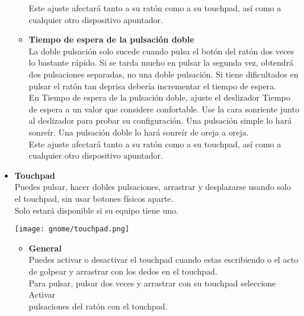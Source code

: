\begin{itemize}
\begin{itemize}
Este ajuste afectará tanto a su ratón como a su touchpad, así como a cualquier otro dispositivo apuntador.
\item{\bf Tiempo de espera de la pulsación doble}\\
La doble pulsación solo sucede cuando pulsa el botón del ratón dos veces lo bastante rápido. Si se tarda mucho en pulsar la segunda vez, obtendrá dos pulsaciones separadas, no una doble pulsación. Si tiene dificultados en pulsar el ratón tan deprisa debería incrementar el tiempo de espera.\\

En Tiempo de espera de la pulsación doble, ajuste el deslizador Tiempo de espera a un valor que considere confortable. Use la cara sonriente junto al deslizador para probar su configuración. Una pulsación simple lo hará sonreír. Una pulsación doble lo hará sonreír de oreja a oreja.\\

Este ajuste afectará tanto a su ratón como a su touchpad, así como a cualquier otro dispositivo apuntador.
\end{itemize}

\item{\large \bf Touchpad}\\
Puedes pulsar, hacer dobles pulsaciones, arrastrar y desplazarse usando solo el touchpad, sin usar botones físicos aparte.\\
Solo estará disponible si su equipo tiene uno.
	\begin{center}
\texttt{[image: gnome/touchpad.png]}
\end{center} 
	\begin{itemize}
\item{\bf General}\\
Puedes activar o desactivar el touchpad cuando estas escribiendo o el acto de golpear y arrastrar con los dedos en el touchpad.\\ 

Para pulsar, pulsar dos veces y arrastrar con su touchpad seleccione Activar\\ pulsaciones del ratón con el touchpad.\\


\end{itemize}
\end{itemize}
